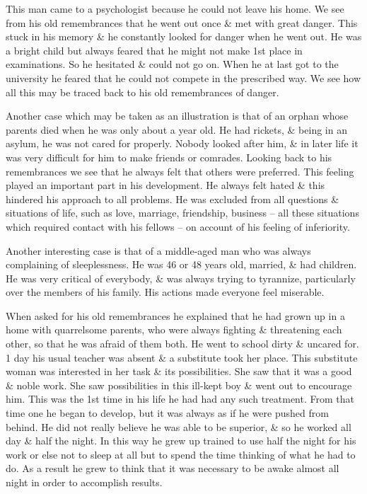 \documentclass{article}
\numberwithin{equation}{section}
\begin{document}
This man came to a psychologist because he could not leave his home. We see from his old remembrances that he went out once \& met with great danger. This stuck in his memory \& he constantly looked for danger when he went out. He was a bright child but always feared that he might not make 1st place in examinations. So he hesitated \& could not go on. When he at last got to the university he feared that he could not compete in the prescribed way. We see how all this may be traced back to his old remembrances of danger.

Another case which may be taken as an illustration is that of an orphan whose parents died when he was only about a year old. He had rickets, \& being in an asylum, he was not cared for properly. Nobody looked after him, \& in later life it was very difficult for him to make friends or comrades. Looking back to his remembrances we see that he always felt that others were preferred. This feeling played an important part in his development. He always felt hated \& this hindered his approach to all problems. He was excluded from all questions \& situations of life, such as love, marriage, friendship, business -- all these situations which required contact with his fellows -- on account of his feeling of inferiority.

Another interesting case is that of a middle-aged man who was always complaining of sleeplessness. He was 46 or 48 years old, married, \& had children. He was very critical of everybody, \& was always trying to tyrannize, particularly over the members of his family. His actions made everyone feel miserable.

When asked for his old remembrances he explained that he had grown up in a home with quarrelsome parents, who were always fighting \& threatening each other, so that he was afraid of them both. He went to school dirty \& uncared for. 1 day his usual teacher was absent \& a substitute took her place. This substitute woman was interested in her task \& its possibilities. She saw that it was a good \& noble work. She saw possibilities in this ill-kept boy \& went out to encourage him. This was the 1st time in his life he had had any such treatment. From that time one he began to develop, but it was always as if he were pushed from behind. He did not really believe he was able to be superior, \& so he worked all day \& half the night. In this way he grew up trained to use half the night for his work or else not to sleep at all but to spend the time thinking of what he had to do. As a result he grew to think that it was necessary to be awake almost all night in order to accomplish results.
\end{document}
